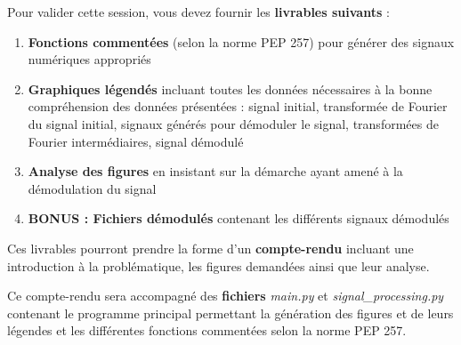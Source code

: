 
Pour valider cette session, vous devez fournir les \textbf{livrables suivants} :

\begin{enumerate}
\item \textbf{Fonctions commentées} (selon la norme PEP 257) pour générer des signaux numériques appropriés
\item \textbf{Graphiques légendés} incluant toutes les données nécessaires à la bonne compréhension des données présentées : signal initial, transformée de Fourier du signal initial, signaux générés pour démoduler le signal, transformées de Fourier intermédiaires, signal démodulé
\item \textbf{Analyse des figures} en insistant sur la démarche ayant amené à la démodulation du signal
\item \textbf{BONUS : Fichiers démodulés} contenant les différents signaux démodulés
\end{enumerate}

\medskip

Ces livrables pourront prendre la forme d'un \textbf{compte-rendu} incluant une introduction à la problématique, les figures demandées ainsi que leur analyse.

Ce compte-rendu sera accompagné des \textbf{fichiers} \mbox{\textit{main.py}} et \mbox{\textit{signal\_processing.py}} contenant le programme principal permettant la génération des figures et de leurs légendes et les différentes fonctions commentées selon la norme PEP 257.
